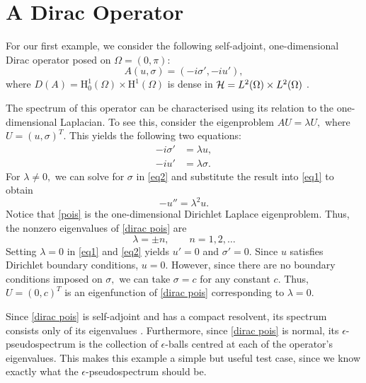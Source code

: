 \section{A Dirac Operator}
For our first example, we consider the following self-adjoint, one-dimensional
Dirac operator posed on $\Omega=(0,\pi)$:
\begin{equation} \label{dirac pois}
    A(u, \sigma) = (-i\sigma', -i u'), 
\end{equation}
where  $D(A) = \text{H}_0^1(\Omega) \times \text{H}^1(\Omega)$ is dense in $\mathcal{H} = L^2(\Omega) \times L^2(\Omega)$ \cite{dirac}. 

The spectrum of this operator can be characterised using its relation to the one-dimensional Laplacian. To see this, consider the eigenproblem $AU = \lambda U,$ where $U = (u, \sigma)^T\!.$ This yields the following two equations:
\begin{align}
-i \sigma' &= \lambda u, \label{eq1}\\
-i u' &= \lambda \sigma. \label{eq2}
\end{align}
For $\lambda \ne 0,$ we can solve for $\sigma$ in \eqref{eq2} and substitute the result into \eqref{eq1} to obtain 
\begin{equation} \label{pois}
    -u'' = \lambda^2u.
\end{equation}
Notice that \eqref{pois} is the one-dimensional Dirichlet Laplace eigenproblem. Thus, the nonzero eigenvalues of \eqref{dirac pois} are
\begin{equation} \label{eigs dirac}
    \lambda = \pm n, \qquad n = 1, 2, \dots 
\end{equation}
 Setting $\lambda = 0$ in \eqref{eq1} and \eqref{eq2} yields $u'=0$ and $\sigma'=0.$ Since $u$ satisfies Dirichlet boundary conditions, $u=0.$ However, since there are no boundary conditions imposed on $\sigma,$ we can take $\sigma = c$ for any constant $c.$ Thus, $U = (0, c)^T$ is an eigenfunction of \eqref{dirac pois} corresponding to $\lambda = 0.$ 

Since \eqref{dirac pois} is self-adjoint and has a compact resolvent, its spectrum consists only of its eigenvalues \cite[Chapter~4]{Resolve}.
Furthermore, since \eqref{dirac pois} is normal, its  $\epsilon$-pseudospectrum is the collection of $\epsilon$-balls centred at each of the operator's eigenvalues. This makes this example a simple but useful test case, since we know exactly what the $\epsilon$-pseudospectrum should be.


